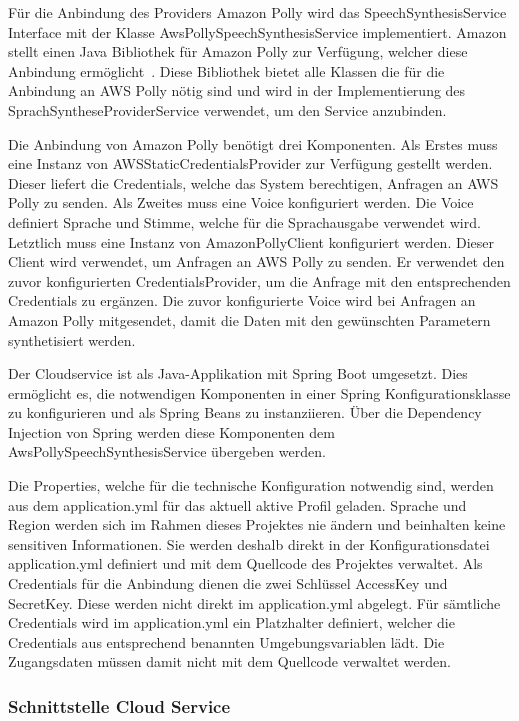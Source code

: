 Für die Anbindung des Providers Amazon Polly wird das SpeechSynthesisService Interface mit der Klasse AwsPollySpeechSynthesisService implementiert.
Amazon stellt einen Java Bibliothek für Amazon Polly zur Verfügung, welcher diese Anbindung ermöglicht~\cite{aws_polly_sdks}.
Diese Bibliothek bietet alle Klassen die für die Anbindung an AWS Polly nötig sind und wird in der Implementierung des SprachSyntheseProviderService verwendet, um den Service anzubinden.

Die Anbindung von Amazon Polly benötigt drei Komponenten.
Als Erstes muss eine Instanz von AWSStaticCredentialsProvider zur Verfügung gestellt werden.
Dieser liefert die Credentials, welche das System berechtigen, Anfragen an AWS Polly zu senden.
Als Zweites muss eine Voice konfiguriert werden.
Die Voice definiert Sprache und Stimme, welche für die Sprachausgabe verwendet wird.
Letztlich muss eine Instanz von AmazonPollyClient konfiguriert werden.
Dieser Client wird verwendet, um Anfragen an AWS Polly zu senden.
Er verwendet den zuvor konfigurierten CredentialsProvider, um die Anfrage mit den entsprechenden Credentials zu ergänzen.
Die zuvor konfigurierte Voice wird bei Anfragen an Amazon Polly mitgesendet, damit die Daten mit den gewünschten Parametern synthetisiert werden.

Der Cloudservice ist als Java-Applikation mit Spring Boot umgesetzt.
Dies ermöglicht es, die notwendigen Komponenten in einer Spring Konfigurationsklasse zu konfigurieren und als Spring Beans zu instanziieren.
Über die Dependency Injection von Spring werden diese Komponenten dem AwsPollySpeechSynthesisService übergeben werden.

Die Properties, welche für die technische Konfiguration notwendig sind, werden aus dem application.yml für das aktuell aktive Profil geladen.
Sprache und Region werden sich im Rahmen dieses Projektes nie ändern und beinhalten keine sensitiven Informationen.
Sie werden deshalb direkt in der Konfigurationsdatei application.yml definiert und mit dem Quellcode des Projektes verwaltet.
Als Credentials für die Anbindung dienen die zwei Schlüssel AccessKey und SecretKey.
Diese werden nicht direkt im application.yml abgelegt.
Für sämtliche Credentials wird im application.yml ein Platzhalter definiert, welcher die Credentials aus entsprechend benannten Umgebungsvariablen lädt.
Die Zugangsdaten müssen damit nicht mit dem Quellcode verwaltet werden.

\subsubsection{Schnittstelle Cloud Service}

